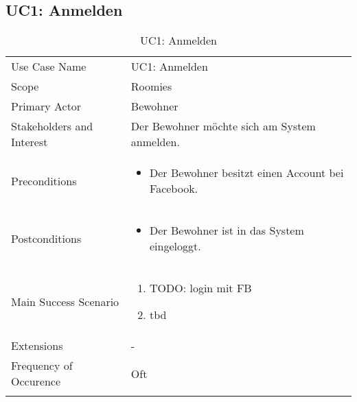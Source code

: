 \subsection{UC1: Anmelden}
\begin{table}[H]
	\tablestyle
	\tablealtcolored
	\begin{tabularx}{\textwidth}{lX}
		\tablebody
			Use Case Name &
			UC1: Anmelden
			\tabularnewline
			Scope &
			Roomies
			\tabularnewline
			Primary Actor &
			Bewohner
			\tabularnewline
			Stakeholders and Interest &
			Der Bewohner möchte sich am System anmelden.
			\tabularnewline
			Preconditions &
			\begin{itemize}
				\item Der Bewohner besitzt einen Account bei Facebook.
			\end{itemize}
			\tabularnewline
			Postconditions &
			\begin{itemize}
				\item Der Bewohner ist in das System eingeloggt.
			\end{itemize}
			\tabularnewline
			Main Success Scenario &
			\begin{enumerate}
				\item TODO: login mit FB
				\item tbd
			\end{enumerate}
			\tabularnewline
			Extensions &
			-
			\tabularnewline
			Frequency of Occurence &
			Oft
			\tabularnewline
		\tableend
	\end{tabularx}
	\caption{UC1: Anmelden}
\end{table}


